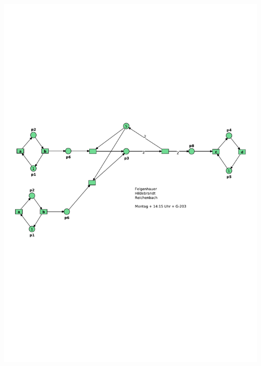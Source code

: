 \documentclass[12pt,a4paper]{../krautsourcing/homework}
\begin{document}
\subsection{}
\includegraphics[scale=0.8,trim={5mm 100mm 5mm 90mm},clip]{Aufgabe_6-4/Aufgabe_6-4-6.pdf}
\end{document}
